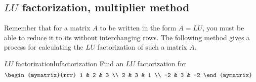 \subsection{$LU$ factorization, multiplier method}

Remember that for a matrix $A$ to be written in the form $A=LU$, you must be able to reduce it to its {\ef} without interchanging rows. The following method gives a process for calculating the $LU$ factorization of such a matrix $A$. 

\begin{example}{$LU$ factorization}{lufactorization}
Find an $LU$ factorization for 
\begin{equation*}
\begin{mymatrix}{rrr}
1 & 2 & 3 \\ 
2 & 3 & 1 \\ 
-2 & 3 & -2
\end{mymatrix}
\end{equation*}
\end{example}

